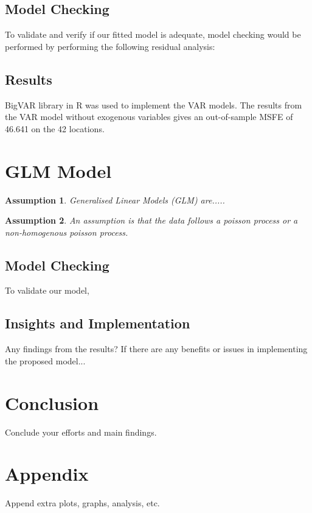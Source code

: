 \documentclass[10pt, letterpaper] {article}
\newtheorem{assumption}{Assumption}
\begin{document}
\subsection{Model Checking}
To validate and verify if our fitted model is adequate, model checking would be performed by performing the following residual analysis:




\subsection{Results}
BigVAR library in R was used to implement the VAR models. The results from the VAR model without exogenous variables gives an out-of-sample MSFE of 46.641 on the 42 locations. 


\section{GLM Model}
\begin{assumption}
Generalised Linear Models (GLM) are.....
\end{assumption}
\begin{assumption}
An assumption is that the data follows a poisson process or a non-homogenous poisson process. 
\end{assumption}

\subsection{Model Checking}
To validate our model,

\subsection{Insights and Implementation}
Any findings from the results? If there are any benefits or issues in implementing the proposed model...
\section{Conclusion}
Conclude your efforts and main findings.

\section{Appendix}
Append extra plots, graphs, analysis, etc. 

 

\end{document}
